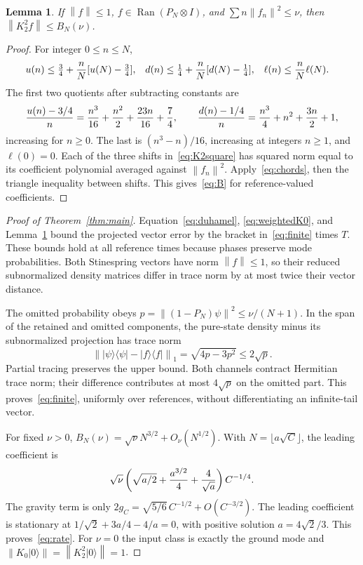 \documentclass[11pt]{article}
\newtheorem{lemma}{Lemma}
\newcommand{\norm}[1]{\left\lVert#1\right\rVert}
\begin{document}
\begin{lemma}\label{lem:charge}
If $\norm f\le1$, $f\in\operatorname{Ran}(P_N\otimes I)$, and
$\sum n\norm{f_n}^2\le\nu$, then $\norm{K_2^2f}\le B_N(\nu)$.
\end{lemma}
\begin{proof}
For integer $0\le n\le N$,
\begin{align}
 u(n)&\le\tfrac34+{n\over N}[u(N)-\tfrac34],&
 d(n)&\le\tfrac14+{n\over N}[d(N)-\tfrac14],&
 \ell(n)&\le{n\over N}\ell(N).\label{eq:chords}
\end{align}
The first two quotients after subtracting constants are
\begin{equation}
 {u(n)-3/4\over n}={n^3\over16}+{n^2\over2}+{23n\over16}+{7\over4},
 \qquad {d(n)-1/4\over n}={n^3\over4}+n^2+{3n\over2}+1,
\end{equation}
increasing for $n\ge0$. The last is $(n^3-n)/16$, increasing at integers
$n\ge1$, and $\ell(0)=0$. Each of the three shifts in~\eqref{eq:K2square}
has squared norm equal to its coefficient polynomial averaged against
$\norm{f_n}^2$. Apply~\eqref{eq:chords}, then the triangle inequality
between shifts. This gives~\eqref{eq:B} for reference-valued coefficients.
\end{proof}

\begin{proof}[Proof of Theorem~\ref{thm:main}]
Equation~\eqref{eq:duhamel}, \eqref{eq:weightedK0}, and
Lemma~\ref{lem:charge} bound the projected vector error by the bracket
in~\eqref{eq:finite} times $T$. These bounds hold at all reference times
because phases preserve mode probabilities. Both Stinespring vectors have
norm $\norm f\le1$, so their reduced subnormalized density matrices
differ in trace norm by at most twice their vector distance.

The omitted probability obeys
$p=\norm{(1-P_N)\psi}^2\le\nu/(N+1)$. In the span of the retained and
omitted components, the pure-state density minus its subnormalized
projection has trace norm
\begin{equation}
 \norm{|\psi\rangle\langle\psi|-|f\rangle\langle f|}_1
       =\sqrt{4p-3p^2}\le2\sqrt p.\label{eq:tail}
\end{equation}
Partial tracing preserves the upper bound. Both channels contract Hermitian
trace norm; their difference contributes at most $4\sqrt p$ on the omitted
part. This proves~\eqref{eq:finite}, uniformly over references, without
differentiating an infinite-tail vector.

For fixed $\nu>0$, $B_N(\nu)=\sqrt\nu N^{3/2}+O_\nu(N^{1/2})$.
With $N=\lfloor a\sqrt C\rfloor$, the leading coefficient is
\begin{equation}
 \sqrt\nu\left(\sqrt{a/2}+{a^{3/2}\over4}+{4\over\sqrt a}\right)C^{-1/4}.
\end{equation}
The gravity term is only $2g_C=\sqrt{5/6}\,C^{-1/2}+O(C^{-3/2})$.
The leading coefficient is stationary at
$1/\sqrt2+3a/4-4/a=0$, with positive solution $a=4\sqrt2/3$.
This proves~\eqref{eq:rate}. For $\nu=0$ the input class is exactly
the ground mode and $\norm{K_0|0\rangle}=\norm{K_2^2|0\rangle}=1$.
\end{proof}
\end{document}
